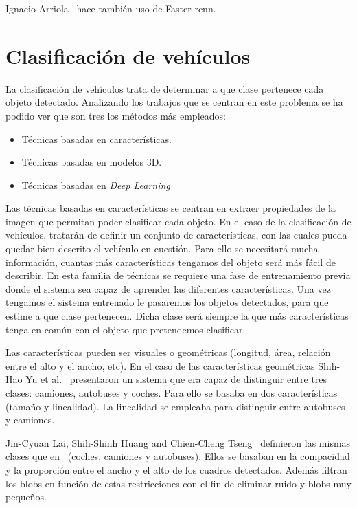 Ignacio Arriola~\cite{tesis_ignacio_arriola} hace también uso de Faster \acrshort{rcnn}.




\section{Clasificación de vehículos}

La clasificación de vehículos trata de determinar a que clase pertenece cada objeto detectado. Analizando los trabajos que se centran en este problema se ha podido ver que son tres los métodos más empleados:
\begin{itemize}
    \item Técnicas basadas en características.
    \item Técnicas basadas en modelos 3D.
    \item Técnicas basadas en \textit{Deep Learning}
\end{itemize}

Las técnicas basadas en características se centran en extraer propiedades de la imagen que permitan poder clasificar cada objeto. En el caso de la clasificación de vehículos, tratarán de definir un conjunto de características, con las cuales pueda quedar bien descrito el vehículo en cuestión. Para ello se necesitará mucha información, cuantas más características tengamos del objeto será más fácil de describir. En esta familia de técnicas se requiere una fase de entrenamiento previa donde el sistema sea capaz de aprender las diferentes características. Una vez tengamos el sistema entrenado le pasaremos los objetos detectados, para que estime a que clase pertenecen. Dicha clase será siempre la que más características tenga en común con el objeto que pretendemos clasificar.
 
Las características pueden ser visuales o geométricas (longitud, área, relación  entre el alto y el ancho, etc). En el caso de las características geométricas Shih-Hao Yu et al.~\cite{an_Automatic_traffic} presentaron un sistema que era capaz de distinguir entre tres clases: camiones, autobuses y coches. Para ello se basaba en dos características (tamaño y linealidad). La linealidad se empleaba para distinguir entre autobuses y camiones.

Jin-Cyuan Lai, Shih-Shinh Huang and Chien-Cheng Tseng~\cite{image_based_vehicle} definieron las mismas clases que en ~\cite{an_Automatic_traffic}(coches, camiones y autobuses). Ellos se basaban en la compacidad y la proporción entre el ancho y el alto de los cuadros detectados. Además filtran los blobs en función de estas restricciones con el fin de eliminar ruido y blobs muy pequeños.

